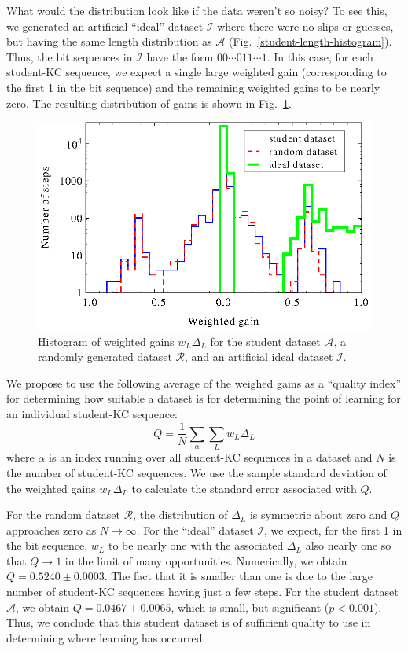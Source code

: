 \documentclass{acmlarge-edm}
\begin{document}
What would the distribution look like if the data weren't 
so noisy?  To see this, we generated an artificial ``ideal'' dataset
$\mathcal{I}$ where there were no slips or guesses, but having
the same length distribution as $\mathcal{A}$ 
(Fig.~\ref{student-length-histogram}).  Thus, the bit sequences
in $\mathcal{I}$ have the form $00\cdots011\cdots1$.
In this case, for each student-KC sequence, we expect a single 
large weighted gain (corresponding to the first 1 in the bit sequence) 
and the remaining weighted gains to be nearly zero.  The resulting 
distribution of gains is shown
in  Fig.~\ref{weighted-gain-histogram2}.

\begin{figure}
  \centering \includegraphics{weighted-gain-histogram2.eps}
   \caption{Histogram of weighted gains $w_L \Delta_L$ for
     the student dataset $\mathcal{A}$, 
     a randomly generated dataset $\mathcal{R}$,
     and an artificial ideal dataset $\mathcal{I}$.}
    \label{weighted-gain-histogram2}
\end{figure}


We propose to use the following average of the weighed gains as
a ``quality index'' for determining how suitable a 
dataset is for determining the point of learning for an individual
student-KC sequence:
%
\begin{equation}
           Q= \frac{1}{N} \sum_\alpha \sum_L w_L \Delta_L
\end{equation}
%
where $\alpha$ is an index running over all student-KC sequences in a 
dataset and $N$ is the number of student-KC sequences.
We use the sample standard deviation of the weighted gains $w_L \Delta_L$
to calculate the standard error associated with $Q$. 

For the random dataset $\mathcal{R}$, the distribution of $\Delta_L$
is symmetric about zero and $Q$ approaches zero as $N \to \infty$.
For the ``ideal'' dataset $\mathcal{I}$, we expect, for the first 1 in
the bit sequence, $w_L$ to be nearly one with the associated $\Delta_L$
also nearly one so that $Q\to 1$ in the limit of many opportunities.
Numerically, we obtain $Q=0.5240\pm0.0003$.  The fact that it is
smaller than one is due to the large number of student-KC sequences having
just a few steps.  For the student dataset $\mathcal{A}$, we obtain
$Q=0.0467\pm0.0065$, which is small, but significant
($p<0.001$). Thus, we conclude that this student dataset is of
sufficient quality to use in determining where learning has occurred.
\end{document}
